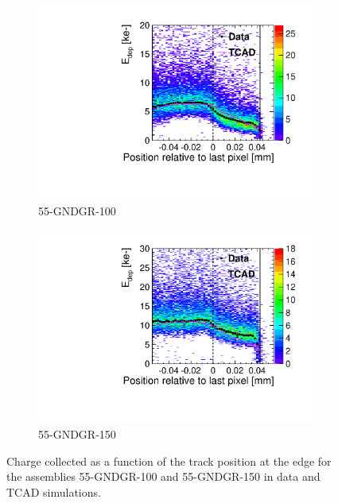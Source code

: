 \begin{figure}[htbp]
  \begin{subfigure}[b]{0.45\textwidth}
    \centering
    \includegraphics[width=\textwidth]{figures/ActiveEdge/55_GNDGR_100_Edep_TCAD_data.pdf}
  \caption{55-GNDGR-100}
  \end{subfigure}\hfill
  \begin{subfigure}[b]{0.45\textwidth}
    \centering
    \includegraphics[width=\textwidth]{figures/ActiveEdge/55_GNDGR_150_Edep_TCAD_data.pdf}
  \caption{55-GNDGR-150}
  \end{subfigure}
  \caption{Charge collected as a function of the track position at the
    edge for the assemblies 55-GNDGR-100 and 55-GNDGR-150 in data and
    TCAD simulations.}
  \label{fig:ChargeCollectionThickGNDGR}
\end{figure}


